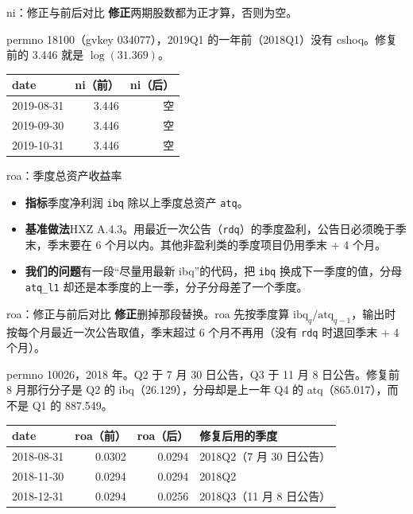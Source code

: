 \documentclass[UTF8,fontset=fandol,aspectratio=169,10pt,t]{ctexbeamer}
\newcommand{\chg}[1]{\textcolor{red!80!black}{#1}}
\newcommand{\kong}{空}
\newcommand{\code}[1]{\texttt{#1}}
\newcommand{\lab}[1]{\textbf{#1}\quad}
\newcommand{\tsize}{\small}
\newcommand{\src}[1]{{\footnotesize\color{black!60}#1}}
\begin{document}
\begin{frame}{ni：修正与前后对比}
\lab{修正}两期股数都为正才算，否则为空。\par\medskip
\src{permno 18100（gvkey 034077），2019Q1 的一年前（2018Q1）没有 cshoq。修复前的 3.446 就是 $\log(31.369)$。}\par\smallskip
{\tsize
\begin{tabular}{l rr}
\toprule
date & ni（前） & ni（后） \\
\midrule
2019-08-31 & 3.446 & \chg{\kong} \\
2019-09-30 & 3.446 & \chg{\kong} \\
2019-10-31 & 3.446 & \chg{\kong} \\
\bottomrule
\end{tabular}}
\end{frame}

\begin{frame}{roa：季度总资产收益率}
\begin{itemize}
\item \lab{指标}季度净利润 \code{ibq} 除以上季度总资产 \code{atq}。
\item \lab{基准做法}HXZ A.4.3。用最近一次公告（\code{rdq}）的季度盈利，公告日必须晚于季末，季末要在 6 个月以内。其他非盈利类的季度项目仍用季末 + 4 个月。
\item \lab{我们的问题}有一段“尽量用最新 ibq”的代码，把 \code{ibq} 换成下一季度的值，分母 \code{atq\_l1} 却还是本季度的上一季，分子分母差了一个季度。
\end{itemize}
\end{frame}

\begin{frame}{roa：修正与前后对比}
\lab{修正}删掉那段替换。roa 先按季度算 $\text{ibq}_q/\text{atq}_{q-1}$，输出时按每个月最近一次公告取值，季末超过 6 个月不再用（没有 \code{rdq} 时退回季末 + 4 个月）。\par\medskip
\src{permno 10026，2018 年。Q2 于 7 月 30 日公告，Q3 于 11 月 8 日公告。修复前 8 月那行分子是 Q2 的 ibq（26.129），分母却是上一年 Q4 的 atq（865.017），而不是 Q1 的 887.549。}\par\smallskip
{\tsize
\begin{tabular}{l rr l}
\toprule
date & roa（前） & roa（后） & 修复后用的季度 \\
\midrule
2018-08-31 & 0.0302 & \chg{0.0294} & 2018Q2（7 月 30 日公告） \\
2018-11-30 & 0.0294 & 0.0294 & 2018Q2 \\
2018-12-31 & 0.0294 & \chg{0.0256} & 2018Q3（11 月 8 日公告） \\
\bottomrule
\end{tabular}}
\end{frame}
\end{document}
